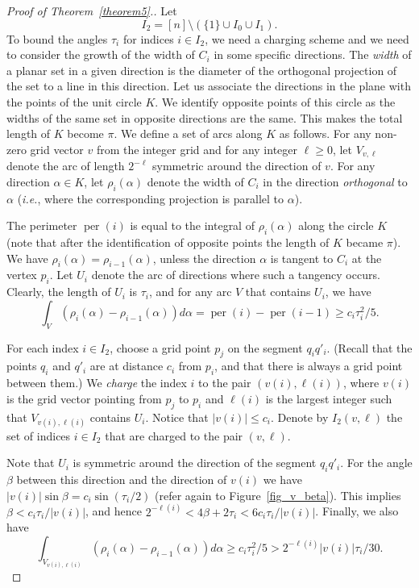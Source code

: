 \documentclass[11pt]{article}
\DeclareMathOperator{\per}{\mathrm{per}}
\begin{document}
\begin{proof}[Proof of Theorem~\ref{theorem5}.]
Let $$I_2=[n]\setminus(\{1\}\cup I_0\cup I_1).$$ To bound the angles $\tau_i$
for indices $i\in I_2$, we need a charging scheme and we need to consider the
growth of the width of $C_i$ in some specific directions. The {\em width} of a
planar set in a given direction is the diameter of the orthogonal projection
of the set to a line in this direction. Let us associate the directions in the
plane with the points of the unit circle $K$. We identify opposite points of
this circle as the widths of the same set in opposite
directions are the same. This makes the total length of $K$ become $\pi$. We
define a set of arcs along $K$ as follows.
For any non-zero grid vector $v$ from the integer grid and for any integer
$\ell\ge0$, let $V_{v,\ell}$ denote the arc of length $2^{-\ell}$ symmetric
around the direction of $v$. For any direction $\alpha\in K$, let
$\rho_i(\alpha)$ denote the width of $C_i$ in the direction {\em orthogonal} to
$\alpha$ ({\em i.e.}, where the corresponding projection is parallel to $\alpha$).

The perimeter $\per(i)$ is equal to the integral of $\rho_i(\alpha)$ along the circle $K$ (note that after the identification of opposite points the length of $K$ became $\pi$). We have $\rho_i(\alpha)=\rho_{i-1}(\alpha)$, unless the direction $\alpha$ is tangent to $C_i$ at the vertex $p_i$. Let $U_i$ denote the arc of directions where such a tangency occurs. Clearly, the length of $U_i$ is $\tau_i$, and for any arc $V$ that contains $U_i$, we have
$$\int_{V}(\rho_i(\alpha)-\rho_{i-1}(\alpha))d\alpha=\per(i)-\per(i-1)\ge
c_i\tau_i^2/5.$$

For each index $i\in I_2$, choose a grid point $p_j$ on the segment $q_iq'_i$. (Recall that the points $q_i$ and $q'_i$ are at distance $c_i$ from $p_i$, and that there is always a grid point between them.) We {\em charge} the index $i$ to the pair $(v(i),\ell(i))$, where $v(i)$ is the grid vector pointing from $p_j$ to $p_i$ and $\ell(i)$ is the largest integer such that $V_{v(i),\ell(i)}$ contains $U_i$. Notice that $|v(i)|\le c_i$. Denote by $I_2(v,\ell)$ the set of indices $i\in I_2$ that are charged to the pair $(v,\ell)$.

Note that $U_i$ is symmetric around the direction of the segment
$q_iq'_i$. For the angle $\beta$ between this direction and the
direction of $v(i)$ we have
$|v(i)|\sin\beta=c_i\sin(\tau_i/2)$ (refer again to Figure~\ref{fig_v_beta}). This implies
$\beta<c_i\tau_i/|v(i)|$, and hence
$2^{-\ell(i)}<4\beta+2\tau_i<6c_i\tau_i/|v(i)|$. Finally, we also have
$$\int_{V_{v(i),\ell(i)}}(\rho_i(\alpha)-\rho_{i-1}(\alpha))d\alpha\ge
c_i\tau_i^2/5>2^{-\ell(i)}|v(i)|\tau_i/30.$$


\end{proof}
\end{document}
